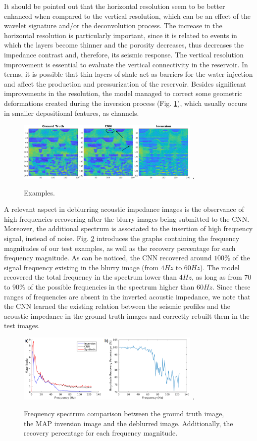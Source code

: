 \documentclass[journal]{IEEEtran}
\begin{document}
It should be pointed out that the horizontal resolution seem to be
better enhanced when compared to the vertical resolution, which can
be an effect of the wavelet signature and/or the deconvolution process.
The increase in the horizontal resolution is particularly important,
since it is related to events in which the layers become thinner and the porosity
decreases, thus decreases the impedance contrast and, therefore, its
seismic response. The vertical resolution improvement is essential to
evaluate the vertical connectivity in the reservoir. In terms, it is possible
that thin layers of shale act as barriers for the water injection and affect the production
and pressurization of the reservoir. Besides significant improvements
in the resolution, the model managed to correct some geometric deformations
created during the inversion process (Fig. \ref{ImSec36}), which usually
occurs in smaller depositional features, as channels.
\begin{figure}[!t]
\centering
\includegraphics[width=3.5in]{Figs/ImSec36}
\DeclareGraphicsExtensions.
\caption{Examples.}
\label{ImSec36}
\end{figure}

A relevant aspect in deblurring acoustic impedance images
is the observance of high frequencies recovering after the
blurry images being submitted to the CNN. Moreover, the
additional spectrum is associated to the insertion
of high frequency signal, instead of noise.
Fig. \ref{frequencies} introduces the graphs containing the frequency
magnitudes of our test examples, as well as the recovery percentage
for each frequency magnitude. As can be noticed,
the CNN recovered around $100$\% of the signal frequency existing
in the blurry image (from $4Hz$ to $60Hz$). The model recovered
the total frequency in the spectrum lower than
$4Hz$, as long as from $70$ to $90$\% of the possible frequencies
in the spectrum higher than $60Hz$.
Since these ranges of frequencies are absent in the inverted acoustic
impedance, we note that the CNN learned the existing relation between the
seismic profiles and the acoustic impedance in the ground truth images
and correctly rebuilt them in the test images.
\begin{figure}[!t]
\centering
\includegraphics[width=3.5in]{Figs/frequencies}
\DeclareGraphicsExtensions.
\caption{Frequency spectrum comparison between the ground truth image,
the MAP inversion image and the deblurred image. Additionally, the recovery percentage
for each frequency magnitude.}
\label{frequencies}
\end{figure}
\end{document}
